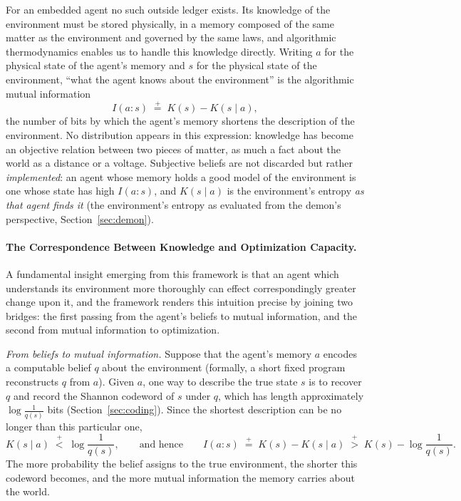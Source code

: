\documentclass[10pt]{article}
\theoremstyle{definition}
\theoremstyle{remark}
\newcommand{\plt}{\mathrel{\stackrel{+}{<}}}
\newcommand{\pgt}{\mathrel{\stackrel{+}{>}}}
\newcommand{\peq}{\mathrel{\stackrel{+}{=}}}
\begin{document}
For an embedded agent no such outside ledger exists. Its knowledge of the environment must be stored physically, in a memory composed of the same matter as the environment and governed by the same laws, and algorithmic thermodynamics enables us to handle this knowledge directly. Writing $a$ for the physical state of the agent's memory and $s$ for the physical state of the environment, ``what the agent knows about the environment'' is the algorithmic mutual information
\[
I(a : s) \;\peq\; K(s) - K(s \mid a),
\]
the number of bits by which the agent's memory shortens the description of the environment. No distribution appears in this expression: knowledge has become an objective relation between two pieces of matter, as much a fact about the world as a distance or a voltage. Subjective beliefs are not discarded but rather \emph{implemented}: an agent whose memory holds a good model of the environment is one whose state has high $I(a:s)$, and $K(s \mid a)$ is the environment's entropy \emph{as that agent finds it} (the environment's entropy as evaluated from the demon's perspective, Section~\ref{sec:demon}).

\paragraph{The Correspondence Between Knowledge and Optimization Capacity.} A fundamental insight emerging from this framework is that an agent which understands its environment more thoroughly can effect correspondingly greater change upon it, and the framework renders this intuition precise by joining two bridges: the first passing from the agent's beliefs to mutual information, and the second from mutual information to optimization.

\emph{From beliefs to mutual information.} Suppose that the agent's memory $a$ encodes a computable belief $q$ about the environment (formally, a short fixed program reconstructs $q$ from $a$). Given $a$, one way to describe the true state $s$ is to recover $q$ and record the Shannon codeword of $s$ under $q$, which has length approximately $\log \tfrac{1}{q(s)}$ bits (Section~\ref{sec:coding}). Since the shortest description can be no longer than this particular one,
\[
K(s \mid a) \;\plt\; \log \frac{1}{q(s)},
\qquad\text{and hence}\qquad
I(a : s) \;\peq\; K(s) - K(s \mid a) \;\pgt\; K(s) - \log \frac{1}{q(s)}.
\]
The more probability the belief assigns to the true environment, the shorter this codeword becomes, and the more mutual information the memory carries about the world.
\end{document}
